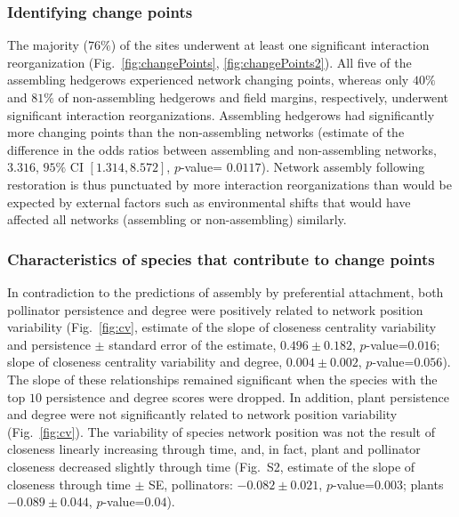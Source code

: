 \documentclass[12pt]{article}
\begin{document}
\subsubsection*{Identifying change points}

The majority ($76\%$) of the sites underwent at least one significant
interaction reorganization (Fig.~\ref{fig:changePoints},
\ref{fig:changePoints2}).  All five of the assembling hedgerows
experienced network changing points, whereas only $40\%$ and $81\%$ of
non-assembling hedgerows and field margins, respectively, underwent
significant interaction reorganizations. Assembling hedgerows had
significantly more changing points than the non-assembling networks
(estimate of the difference in the odds ratios between assembling and
non-assembling networks, $3.316$, $95\%$ CI $[1.314, 8.572]$,
$p$-value= $0.0117$). Network assembly following restoration is thus
punctuated by more interaction reorganizations than would be expected
by external factors such as environmental shifts that would have
affected all networks (assembling or non-assembling) similarly.

\subsubsection*{Characteristics of species that contribute to change
  points}

In contradiction to the predictions of assembly by preferential
attachment, both pollinator persistence and degree were positively
related to network position variability (Fig.~\ref{fig:cv}, estimate
of the slope of closeness centrality variability and persistence $\pm$
standard error of the estimate, $0.496 \pm 0.182$, $p$-value=$0.016$;
slope of closeness centrality variability and degree, $0.004 \pm
0.002$, $p$-value=$0.056$). The slope of these relationships remained
significant when the species with the top $10$ persistence and degree
scores were dropped. In addition, plant persistence and degree were
not significantly related to network position variability
(Fig.~\ref{fig:cv}).  The variability of species network position was
not the result of closeness linearly increasing through time, and, in
fact, plant and pollinator closeness decreased slightly through time
(Fig.~S2, estimate of the slope of closeness through time $\pm$ SE,
pollinators: $-0.082 \pm 0.021$, $p$-value=$0.003$; plants $-0.089 \pm
0.044$, $p$-value=$0.04$).
\end{document}
